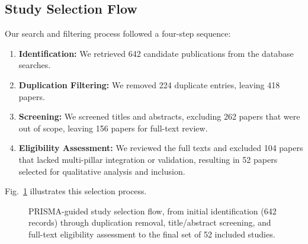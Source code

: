 \documentclass[journal,10pt,compsoc]{IEEEtran}
\begin{document}
\subsection{Study Selection Flow}
Our search and filtering process followed a four-step sequence:
\begin{enumerate}
    \item \textbf{Identification:} We retrieved 642 candidate publications from the database searches.
    \item \textbf{Duplication Filtering:} We removed 224 duplicate entries, leaving 418 papers.
    \item \textbf{Screening:} We screened titles and abstracts, excluding 262 papers that were out of scope, leaving 156 papers for full-text review.
    \item \textbf{Eligibility Assessment:} We reviewed the full texts and excluded 104 papers that lacked multi-pillar integration or validation, resulting in 52 papers selected for qualitative analysis and inclusion.
\end{enumerate}
Fig.~\ref{fig:prisma_flow} illustrates this selection process.

\begin{figure}[t]
\centering
{}
\caption{PRISMA-guided study selection flow, from initial identification (642 records) through duplication removal, title/abstract screening, and full-text eligibility assessment to the final set of 52 included studies.}
\label{fig:prisma_flow}
\end{figure}
\end{document}
